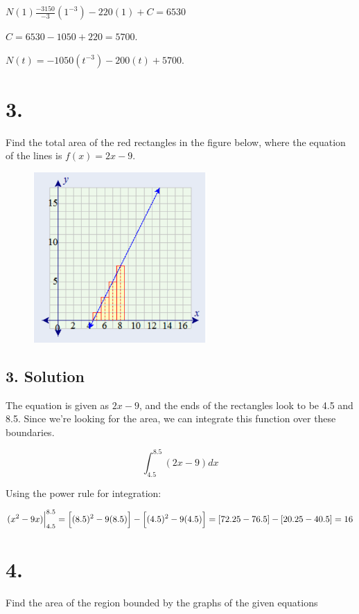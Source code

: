 \documentclass[]{article}
\begin{document}
\(N(1) \frac{-3150}{-3}(1^{-3}) - 220(1) + C = 6530\)

\(C = 6530 - 1050 + 220 = 5700\).

\(N(t) = -1050(t^{-3}) - 200(t) + 5700\).

\section{3.}\label{section-2}

Find the total area of the red rectangles in the figure below, where the
equation of the lines is \(f(x) = 2x - 9\).

\begin{figure}
\centering
\includegraphics[width=2.60417in]{3_graph.png}
\caption{}
\end{figure}

\subsection{3. Solution}\label{solution-2}

The equation is given as \(2x - 9\), and the ends of the rectangles look
to be 4.5 and 8.5. Since we're looking for the area, we can integrate
this function over these boundaries.

\[
\int_{4.5}^{8.5}(2x - 9)dx
\]

Using the power rule for integration:

\[
(x^2 - 9x)\Big|_{4.5}^{8.5} = \Big[(8.5)^2 - 9(8.5)\Big] - \Big[(4.5)^2 - 9(4.5)\Big]
\\
= [72.25 - 76.5] - [20.25 - 40.5] = 16
\]

\section{4.}\label{section-3}

Find the area of the region bounded by the graphs of the given equations
\end{document}
